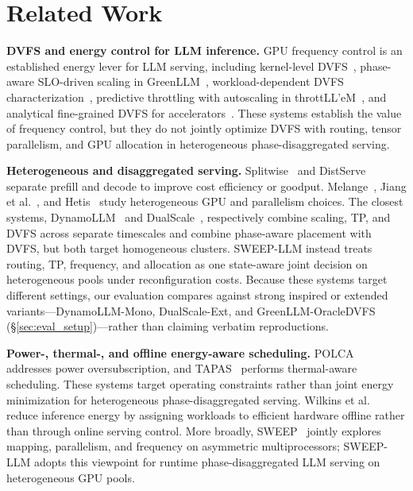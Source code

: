 \section{Related Work}
\label{sec:related}

\textbf{DVFS and energy control for LLM inference.}
GPU frequency control is an established energy lever for LLM serving, including kernel-level DVFS~\cite{huang2026reducing}, phase-aware SLO-driven scaling in GreenLLM~\cite{ye2025greenllm}, workload-dependent DVFS characterization~\cite{patel2025investigating}, predictive throttling with autoscaling in throttLL'eM~\cite{kakolyris2025throttllem}, and analytical fine-grained DVFS for accelerators~\cite{wang2025asplos}.
These systems establish the value of frequency control, but they do not jointly optimize DVFS with routing, tensor parallelism, and GPU allocation in heterogeneous phase-disaggregated serving.

\textbf{Heterogeneous and disaggregated serving.}
Splitwise~\cite{patel2024splitwise} and DistServe~\cite{zhong2024distserve} separate prefill and decode to improve cost efficiency or goodput.
Melange~\cite{griggs2024melange}, Jiang et al.~\cite{jiang2025demystifying}, and Hetis~\cite{liu2025hetis} study heterogeneous GPU and parallelism choices.
The closest systems, DynamoLLM~\cite{stojkovic2024dynamollm} and DualScale~\cite{biscale2025}, respectively combine scaling, TP, and DVFS across separate timescales and combine phase-aware placement with DVFS, but both target homogeneous clusters.
SWEEP-LLM instead treats routing, TP, frequency, and allocation as one state-aware joint decision on heterogeneous pools under reconfiguration costs.
Because these systems target different settings, our evaluation compares against strong inspired or extended variants---DynamoLLM-Mono, DualScale-Ext, and GreenLLM-OracleDVFS (\S\ref{sec:eval_setup})---rather than claiming verbatim reproductions.

\textbf{Power-, thermal-, and offline energy-aware scheduling.}
POLCA~\cite{patel2024polca} addresses power oversubscription, and TAPAS~\cite{stojkovic2025tapas} performs thermal-aware scheduling.
These systems target operating constraints rather than joint energy minimization for heterogeneous phase-disaggregated serving.
Wilkins et al.~\cite{wilkins2024hybrid,wilkins2024offline} reduce inference energy by assigning workloads to efficient hardware offline rather than through online serving control.
More broadly, SWEEP~\cite{chen2024sweep} jointly explores mapping, parallelism, and frequency on asymmetric multiprocessors; SWEEP-LLM adopts this viewpoint for runtime phase-disaggregated LLM serving on heterogeneous GPU pools.

